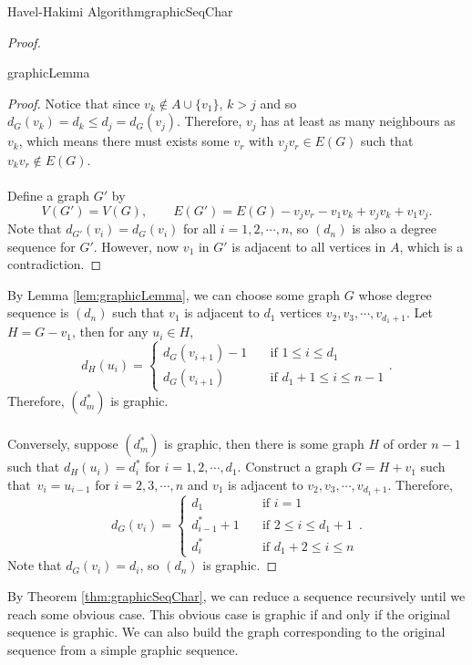 \documentclass[math]{amznotes}
\theoremstyle{remark}
\newcommand{\0}{\mathbf{0}}
\newcommand{\1}{\mathbf{1}}
\begin{document}
\begin{thmbox}{Havel-Hakimi Algorithm}{graphicSeqChar}
\begin{proof}
\begin{lembox}{}{graphicLemma}
\begin{proof}
                Notice that since $v_k \notin A \cup \{v_1\}$, $k > j$ and so $d_G(v_k) = d_k \leq d_j = d_G(v_j)$. Therefore, $v_j$ has at least as many neighbours as $v_k$, which means there must exists some $v_r$ with $v_jv_r \in E(G)$ such that $v_kv_r \notin E(G)$.
                \\\\
                Define a graph $G'$ by
                \begin{equation*}
                    V(G') = V(G), \qquad E(G') = E(G) - v_jv_r - v_1v_k + v_jv_k + v_1v_j.
                \end{equation*}
                Note that $d_{G'}(v_i) = d_G(v_i)$ for all $i = 1, 2, \cdots, n$, so $(d_n)$ is also a degree sequence for $G'$. However, now $v_1$ in $G'$ is adjacent to all vertices in $A$, which is a contradiction.
            \end{proof}
        \end{lembox}
        By Lemma \ref{lem:graphicLemma}, we can choose some graph $G$ whose degree sequence is $(d_n)$ such that $v_1$ is adjacent to $d_1$ vertices $v_2, v_3, \cdots, v_{d_1 + 1}$. Let $H = G - v_1$, then for any $u_i \in H$,
        \begin{equation*}
            d_H(u_i) = \begin{cases}
                d_G(v_{i + 1}) - 1 & \quad\textrm{if } 1 \leq i \leq d_1 \\
                d_G(v_{i + 1}) & \quad\textrm{if } d_1 + 1 \leq i \leq n - 1
            \end{cases}.
        \end{equation*}
        Therefore, $\left(d^*_m\right)$ is graphic.
        \\\\
        Conversely, suppose $\left(d^*_m\right)$ is graphic, then there is some graph $H$ of order $n - 1$ such that $d_H(u_i) = d^*_i$ for $i = 1, 2, \cdots, d_1$. Construct a graph $G = H + v_1$ such that~$v_i = u_{i - 1}$ for $i = 2, 3, \cdots, n$ and $v_1$ is adjacent to $v_2, v_3, \cdots, v_{d_1 + 1}$. Therefore,
        \begin{equation*}
            d_G(v_i) = \begin{cases}
                d_1 & \quad\textrm{if } i = 1 \\
                d^*_{i - 1} + 1 & \quad\textrm{if } 2 \leq i \leq d_1 + 1 \\
                d^*_{i} & \quad\textrm{if } d_1 + 2 \leq i \leq n
            \end{cases}.
        \end{equation*}
        Note that $d_G(v_i) = d_i$, so $(d_n)$ is graphic.
    \end{proof}
\end{thmbox}
By Theorem \ref{thm:graphicSeqChar}, we can reduce a sequence recursively until we reach some obvious case. This obvious case is graphic if and only if the original sequence is graphic. We can also build the graph corresponding to the original sequence from a simple graphic sequence.
\end{document}
